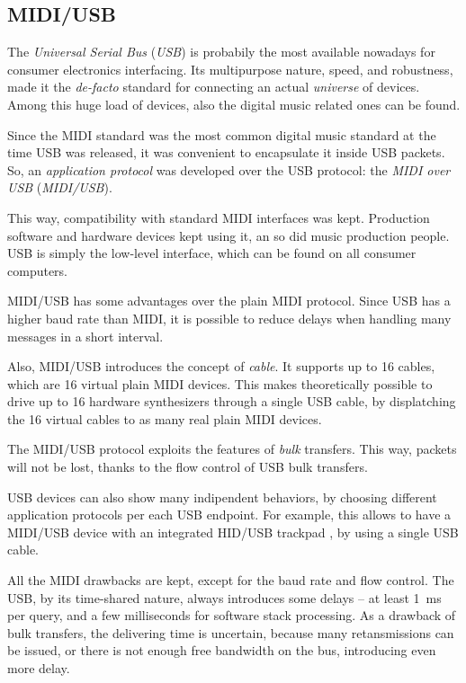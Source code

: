 \documentclass[a4paper,10pt]{article}
\begin{document}
\begin{multicols}{2}
\subsection{MIDI/USB}

The \emph{Universal Serial Bus} (\emph{USB}) \CITEME is probabily the most
available nowadays for consumer electronics interfacing. Its multipurpose
nature, speed, and robustness, made it the \emph{de-facto} standard for
connecting an actual \emph{universe} of devices. Among this huge load of
devices, also the digital music related ones can be found.

Since the MIDI standard was the most common digital music standard at the time
USB was released, it was convenient to encapsulate it inside USB packets.
So, an \emph{application protocol} was developed over the USB protocol: the
\emph{MIDI over USB} (\emph{MIDI/USB}).

This way, compatibility with standard MIDI interfaces was kept. Production
software and hardware devices kept using it, an so did music production
people. USB is simply the low-level interface, which can be found on all
consumer computers.

MIDI/USB has some advantages over the plain MIDI protocol. Since USB has a
higher baud rate than MIDI, it is possible to reduce delays when handling
many messages in a short interval.

Also, MIDI/USB introduces the concept of \emph{cable}. It supports up to 16
cables, which are 16 virtual plain MIDI devices. This makes theoretically
possible to drive up to 16 hardware synthesizers through a single USB cable,
by displatching the 16 virtual cables to as many real plain MIDI devices.

The MIDI/USB protocol exploits the features of \emph{bulk} transfers. This
way, packets will not be lost, thanks to the flow control of USB bulk
transfers.

USB devices can also show many indipendent behaviors, by choosing different
application protocols per each USB endpoint. For example, this allows to have
a MIDI/USB device with an integrated HID/USB trackpad \CITEME, by using a
single USB cable.

All the MIDI drawbacks are kept, except for the baud rate and flow control.
The USB, by its time-shared nature, always introduces some delays -- at
least 1~ms per query, and a few milliseconds for software stack processing.
As a drawback of bulk transfers, the delivering time is uncertain, because
many retansmissions can be issued, or there is not enough free bandwidth on
the bus, introducing even more delay.



\end{multicols}
\end{document}
